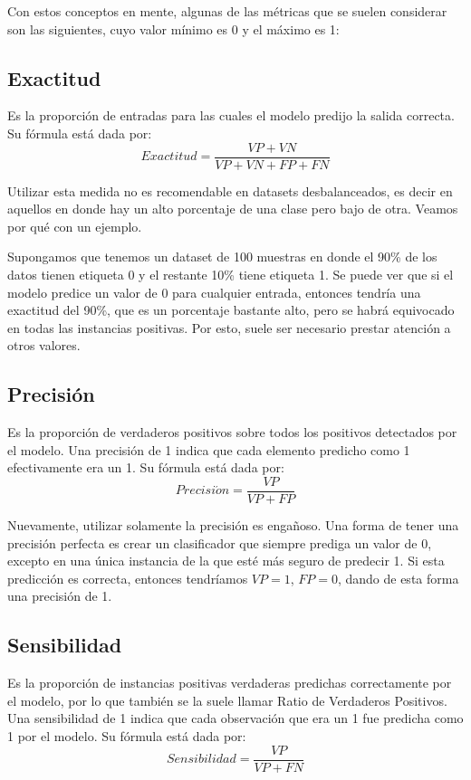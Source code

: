\documentclass[../../main.tex]{subfiles}
\begin{document}
Con estos conceptos en mente, algunas de las métricas que se suelen considerar son las
siguientes, cuyo valor mínimo es 0 y el máximo es 1:
\subsection{Exactitud}
Es la proporción de entradas para las cuales el modelo predijo la salida correcta.
Su fórmula está dada por:
\[
    Exactitud = \frac{VP + VN}{VP + VN + FP + FN}
\]

Utilizar esta medida no es recomendable en datasets desbalanceados, es decir en aquellos
en donde hay un alto porcentaje de una clase pero bajo de otra. Veamos por qué con un
ejemplo.

Supongamos que tenemos un dataset de 100 muestras en donde el 90\% de los datos tienen
etiqueta 0 y el restante 10\% tiene etiqueta 1. Se puede ver que si el modelo predice un
valor de 0 para cualquier entrada, entonces tendría una exactitud del 90\%, que es un
porcentaje bastante alto, pero se habrá equivocado en todas las instancias positivas.
Por esto, suele ser necesario prestar atención a otros valores.

\subsection{Precisión}
Es la proporción de verdaderos positivos sobre todos los positivos detectados por el
modelo. Una precisión de 1 indica que cada elemento predicho como 1 efectivamente
era un 1. Su fórmula está dada por:
\[
    Precisi\acute{o}n = \frac{VP}{VP + FP}
\]

Nuevamente, utilizar solamente la precisión es engañoso. Una forma de tener una precisión
perfecta es crear un clasificador que siempre prediga un valor de 0, excepto en una única
instancia de la que esté más seguro de predecir 1. Si esta predicción es correcta,
entonces tendríamos \(VP=1\), \(FP=0\), dando de esta forma una precisión de 1.

\subsection{Sensibilidad}
Es la proporción de instancias positivas verdaderas predichas correctamente por el modelo,
por lo que también se la suele llamar Ratio de Verdaderos Positivos. Una sensibilidad de 1
indica que cada observación que era un 1 fue predicha como 1 por el modelo. Su fórmula
está dada por:
\[
    Sensibilidad = \frac{VP}{VP + FN}
\]
\end{document}
